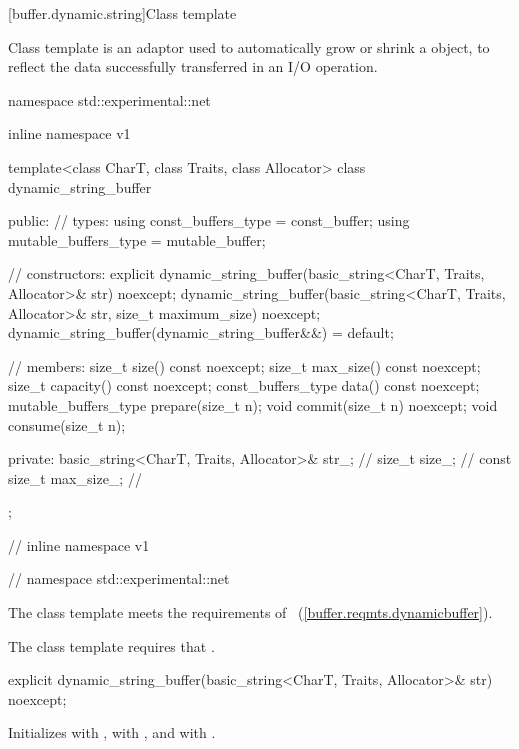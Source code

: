 [buffer.dynamic.string]{Class template }

%
\pnum
Class template  is an adaptor used to automatically grow or shrink a  object, to reflect the data successfully transferred in an I/O operation.

\begin{codeblock}
namespace std::experimental::net {
inline namespace v1 {

  template<class CharT, class Traits, class Allocator>
  class dynamic_string_buffer
  {
  public:
    // types:
    using const_buffers_type = const_buffer;
    using mutable_buffers_type = mutable_buffer;

    // constructors:
    explicit dynamic_string_buffer(basic_string<CharT, Traits, Allocator>& str) noexcept;
    dynamic_string_buffer(basic_string<CharT, Traits, Allocator>& str,
                          size_t maximum_size) noexcept;
    dynamic_string_buffer(dynamic_string_buffer&&) = default;

    // members:
    size_t size() const noexcept;
    size_t max_size() const noexcept;
    size_t capacity() const noexcept;
    const_buffers_type data() const noexcept;
    mutable_buffers_type prepare(size_t n);
    void commit(size_t n) noexcept;
    void consume(size_t n);

  private:
    basic_string<CharT, Traits, Allocator>& str_; // \expos
    size_t size_; // \expos
    const size_t max_size_; // \expos
  };

} // inline namespace v1
} // namespace std::experimental::net
\end{codeblock}

\pnum
The  class template meets the requirements of ~(\ref{buffer.reqmts.dynamicbuffer}).

\pnum
The  class template requires that .

%
\begin{itemdecl}
explicit dynamic_string_buffer(basic_string<CharT, Traits, Allocator>& str) noexcept;
\end{itemdecl}

\begin{itemdescr}
\pnum
\effects Initializes  with ,  with , and  with .
\end{itemdescr}

